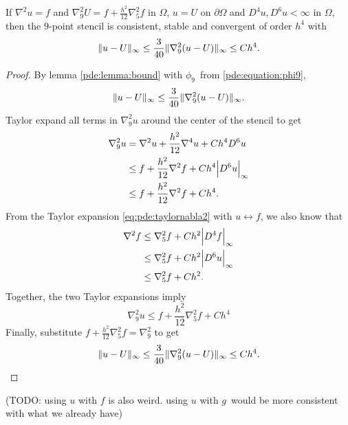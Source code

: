 \begin{theorem}\label{thm:nine}
If $\nabla^2 u = f$ and $\nabla_9^2 U = f + \frac{h^2}{12} \nabla_5^2 f$ in $\Omega$, $u = U$ on $\partial \Omega$ and $D^4 u, D^6 u < \infty$ in $\Omega$,
then the $9$-point stencil is consistent, stable and convergent of order $h^4$ with
$$
\lVert u - U \rVert_\infty \leq \frac{3}{40} \lVert \nabla_9^2(u-U) \rVert_\infty \leq C h^4.
$$
\end{theorem}
\begin{proof}
By lemma \ref{pde:lemma:bound} with $\phi_9$ from \ref{pde:equation:phi9},
$$
\lVert u - U \rVert_\infty \leq \frac{3}{40} \lVert \nabla_9^2 (u  - U) \rVert_\infty.
$$
Taylor expand all terms in $\nabla_9^2 u$ around the center of the stencil to get
\begin{equation*}
\begin{split}
\nabla_9^2 u &= \nabla^2 u + \frac{h^2}{12} \nabla^4 u + C h^4 D^6 u \\
             &\leq f + \frac{h^2}{12} \nabla^2 f + Ch^4 \abs{D^6 u}_\infty \\
             &\leq f + \frac{h^2}{12} \nabla^2 f + Ch^4.\\
\end{split}
\end{equation*}
From the Taylor expansion \ref{eq:pde:taylornabla2} with $u \leftrightarrow f$, we also know that
\begin{equation*}
\begin{split}
\nabla^2 f &\leq \nabla_5^2 f + Ch^2 \abs{D^4 f}_\infty \\
           &\leq \nabla_5^2 f + Ch^2 \abs{D^6 u}_\infty \\
           &\leq \nabla_5^2 f + Ch^2.
\end{split}
\end{equation*}
Together, the two Taylor expansions imply
\begin{equation}
	\nabla_9^2 u \leq f + \frac{h^2}{12} \nabla_5^2 f + Ch^4
\label{eq:pde:taylornabla22}
\end{equation}
Finally, substitute $f + \frac{h^2}{12} \nabla_5^2 f = \nabla_9^2$ to get
\begin{equation*}
  \lVert u-U \rVert_\infty \leq \frac{3}{40} \lVert \nabla_9^2 (u - U) \rVert_\infty \leq C h^4. \qedhere
\end{equation*}
\end{proof}

(TODO: using $u$ with $f$ is also weird. using $u$ with $g$ would be more consistent with what we already have)

